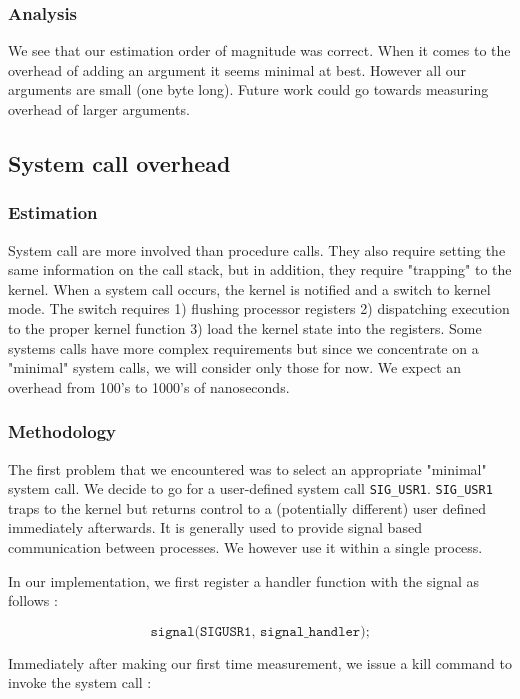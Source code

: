 \subsubsection{Analysis}

We see that our estimation order of magnitude was correct. When it comes to the overhead of adding
an argument it seems minimal at best. However all our arguments are small (one byte long). 
Future work could go towards measuring overhead of larger arguments.

\subsection{System call overhead}

\subsubsection{Estimation}

System call are more involved than procedure calls. They also require setting the same information on the call stack,
but in addition, they require "trapping" to the kernel. When a system call occurs, the kernel is notified and a switch
to kernel mode. The switch requires 1) flushing processor registers 2) dispatching execution
to the proper kernel function 3) load the kernel state into the registers. Some systems calls have more complex requirements
but since we concentrate on a "minimal" system calls, we will consider only those for now. We expect an
overhead from 100's to 1000's of nanoseconds.

\subsubsection{Methodology}

The first problem that we encountered was to select an appropriate "minimal" system call. We decide to
go for a user-defined system call \texttt{SIG\_USR1}. \texttt{SIG\_USR1} traps to the kernel but returns control
to a (potentially different) user defined immediately afterwards. It is generally used to provide signal based
communication between processes. We however use it within a single process.

In our implementation, we first register a handler function with the signal as follows :

$$ \texttt{signal(SIGUSR1, signal\_handler);}$$

Immediately after making our first time measurement, we issue a kill command to
invoke the system call :

